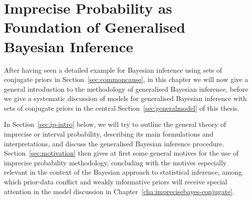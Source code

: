 \chapter{Imprecise Probability as Foundation of Generalised Bayesian Inference}
\label{cha:gbi}




After having seen a detailed example for Bayesian inference using sets of conjugate priors in Section~\ref{sec:commoncause},
in this chapter we will now give a general introduction to the methodology of generalised Bayesian inference,
before we give a systematic discussion of models for generalised Bayesian inference with sets of conjugate priors
in the central Section~\ref{sec:generalmodel} of this thesis.

\medskip

In Section~\ref{sec:ip-intro} below, we will try to outline the general theory of imprecise or interval probability,
describing its main formulations and interpretations, and discuss the generalised Bayesian inference procedure.
Section~\ref{sec:motivation} then gives at first some general motives for the use of imprecise probability methodology,
concluding with the motives especially relevant in the context of the Bayesian approach to statistical inference,
among which prior-data conflict and weakly informative priors will receive special attention
in the model discussion in Chapter~\ref{cha:imprecisebayes-conjugate}.



